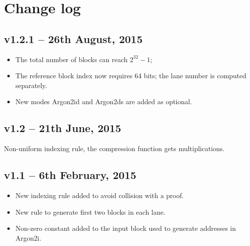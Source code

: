 \documentclass[a4paper]{article}
\begin{document}
\section{Change log}

\subsection{v1.2.1 -- 26th August, 2015}
\begin{itemize}
\item The total number of blocks can reach $2^{32}-1$;
\item The reference block index now requires 64 bits; the lane number is computed separately.
\item New modes \textsf{Argon2id} and \textsf{Argon2ds} are added as optional.
\end{itemize}

\subsection{v1.2  -- 21th June, 2015}

Non-uniform  indexing rule, the compression function gets multiplications.

\subsection{v1.1  -- 6th February, 2015}
\begin{itemize}
\item New indexing rule added to avoid collision with a proof. 
\item New rule to generate first two blocks in each lane.
\item Non-zero constant added to the input block used to generate addresses in \textsf{Argon2i}.
\end{itemize}
\end{document}
